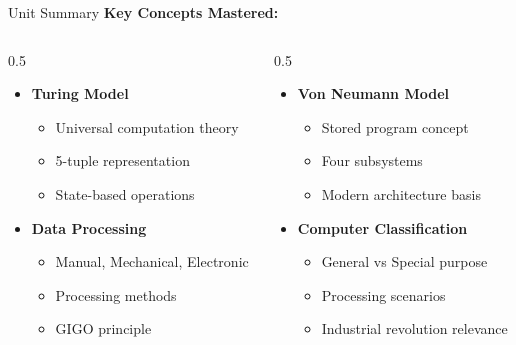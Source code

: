 \documentclass[aspectratio=169]{beamer}
\begin{document}
\begin{frame}{Unit Summary}
    \textbf{Key Concepts Mastered:}
    
    \begin{columns}
        \begin{column}{0.5\textwidth}
            \begin{itemize}
                \item[\faCheck] \textbf{Turing Model}
                \begin{itemize}
                    \item Universal computation theory
                    \item 5-tuple representation
                    \item State-based operations
                \end{itemize}
                
                \item[\faCheck] \textbf{Data Processing}
                \begin{itemize}
                    \item Manual, Mechanical, Electronic
                    \item Processing methods
                    \item GIGO principle
                \end{itemize}
            \end{itemize}
        \end{column}
        \begin{column}{0.5\textwidth}
            \begin{itemize}
                \item[\faCheck] \textbf{Von Neumann Model}
                \begin{itemize}
                    \item Stored program concept
                    \item Four subsystems
                    \item Modern architecture basis
                \end{itemize}
                
                \item[\faCheck] \textbf{Computer Classification}
                \begin{itemize}
                    \item General vs Special purpose
                    \item Processing scenarios
                    \item Industrial revolution relevance
                \end{itemize}
            \end{itemize}
        \end{column}
    \end{columns}
    

\end{frame}
\end{document}
